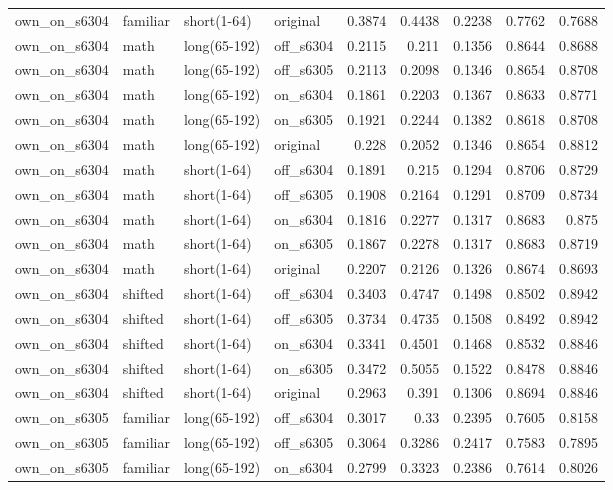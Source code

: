 \begin{table}
\begin{tabular}{llllrrrrr}
own\_on\_s6304 & familiar & short(1-64) & original & 0.3874 & 0.4438 & 0.2238 & 0.7762 & 0.7688 \\
own\_on\_s6304 & math & long(65-192) & off\_s6304 & 0.2115 & 0.211 & 0.1356 & 0.8644 & 0.8688 \\
own\_on\_s6304 & math & long(65-192) & off\_s6305 & 0.2113 & 0.2098 & 0.1346 & 0.8654 & 0.8708 \\
own\_on\_s6304 & math & long(65-192) & on\_s6304 & 0.1861 & 0.2203 & 0.1367 & 0.8633 & 0.8771 \\
own\_on\_s6304 & math & long(65-192) & on\_s6305 & 0.1921 & 0.2244 & 0.1382 & 0.8618 & 0.8708 \\
own\_on\_s6304 & math & long(65-192) & original & 0.228 & 0.2052 & 0.1346 & 0.8654 & 0.8812 \\
own\_on\_s6304 & math & short(1-64) & off\_s6304 & 0.1891 & 0.215 & 0.1294 & 0.8706 & 0.8729 \\
own\_on\_s6304 & math & short(1-64) & off\_s6305 & 0.1908 & 0.2164 & 0.1291 & 0.8709 & 0.8734 \\
own\_on\_s6304 & math & short(1-64) & on\_s6304 & 0.1816 & 0.2277 & 0.1317 & 0.8683 & 0.875 \\
own\_on\_s6304 & math & short(1-64) & on\_s6305 & 0.1867 & 0.2278 & 0.1317 & 0.8683 & 0.8719 \\
own\_on\_s6304 & math & short(1-64) & original & 0.2207 & 0.2126 & 0.1326 & 0.8674 & 0.8693 \\
own\_on\_s6304 & shifted & short(1-64) & off\_s6304 & 0.3403 & 0.4747 & 0.1498 & 0.8502 & 0.8942 \\
own\_on\_s6304 & shifted & short(1-64) & off\_s6305 & 0.3734 & 0.4735 & 0.1508 & 0.8492 & 0.8942 \\
own\_on\_s6304 & shifted & short(1-64) & on\_s6304 & 0.3341 & 0.4501 & 0.1468 & 0.8532 & 0.8846 \\
own\_on\_s6304 & shifted & short(1-64) & on\_s6305 & 0.3472 & 0.5055 & 0.1522 & 0.8478 & 0.8846 \\
own\_on\_s6304 & shifted & short(1-64) & original & 0.2963 & 0.391 & 0.1306 & 0.8694 & 0.8846 \\
own\_on\_s6305 & familiar & long(65-192) & off\_s6304 & 0.3017 & 0.33 & 0.2395 & 0.7605 & 0.8158 \\
own\_on\_s6305 & familiar & long(65-192) & off\_s6305 & 0.3064 & 0.3286 & 0.2417 & 0.7583 & 0.7895 \\
own\_on\_s6305 & familiar & long(65-192) & on\_s6304 & 0.2799 & 0.3323 & 0.2386 & 0.7614 & 0.8026 \\

\end{tabular}
\end{table}
